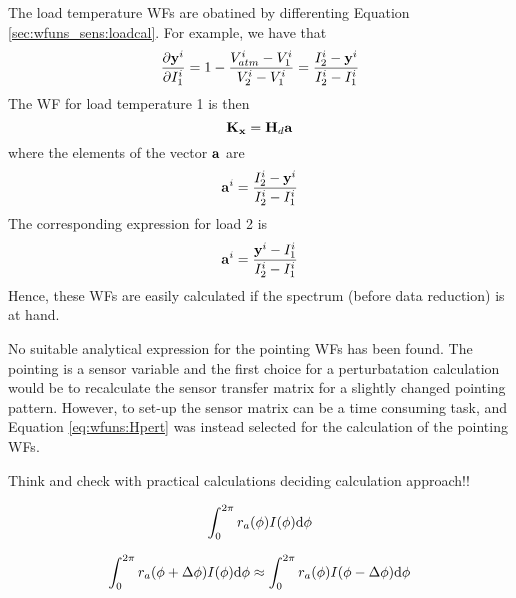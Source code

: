  The load temperature WFs are obatined by differenting Equation
 \ref{sec:wfuns_sens:loadcal}. For example, we have that \citep{eriksson:97a}
 \begin{equation}
   \frac{\partial \mathbf{y}^i}{\partial I_1^i} = 1 - 
     \frac{V_{atm}^i-V_1^i}{V_2^i-V_1^i} = \frac{I_2^i-\mathbf{y}^i}{I_2^i-I_1^i} 
 \end{equation}
 The WF for load temperature 1 is then
 \begin{equation}
   \mathbf{K}_{\mathbf{x}} = \mathbf{H}_d \mathbf{a}
 \end{equation}
 where the elements of the vector $\mathbf{a}$ are
 \begin{equation}
   \mathbf{a}^i = \frac{I_2^i-\mathbf{y}^i}{I_2^i-I_1^i}
 \end{equation}
 The corresponding expression for load 2 is
 \begin{equation}
   \mathbf{a}^i = \frac{\mathbf{y}^i-I_1^i}{I_2^i-I_1^i}
 \end{equation}
 Hence, these WFs are easily calculated if the spectrum (before data
 reduction) is at hand.



 \label{sec:wfuns_sens:point}
 
 No suitable analytical expression for the pointing WFs has been
 found.  The pointing is a sensor variable and the first choice for a
 perturbatation calculation would be to recalculate the sensor
 transfer matrix for a slightly changed pointing pattern. However, to
 set-up the sensor matrix can be a time consuming task, and Equation
 \ref{eq:wfuns:Hpert} was instead selected for the calculation of the
 pointing WFs.

 Think and check with practical calculations deciding calculation approach!!
 
 \begin{eqnarray}
   \int_{0}^{2\pi} r_a(\phi) I(\phi) \mathrm{d} \phi \nonumber
 \end{eqnarray}

 \begin{eqnarray}
   \int_{0}^{2\pi} r_a(\phi+\Delta \phi) I(\phi) \mathrm{d} \phi \approx
   \int_{0}^{2\pi} r_a(\phi) I(\phi-\Delta \phi) \mathrm{d} \phi \nonumber
 \end{eqnarray}


 \label{sec:wfuns_sens:freq}





